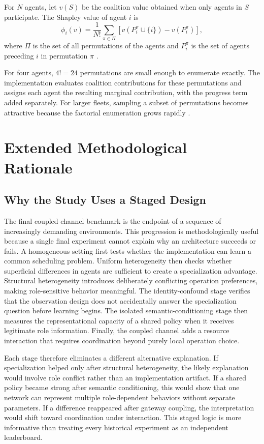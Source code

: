 \documentclass{iutbscthesis}
\begin{document}
\begin{appendices}
For $N$ agents, let $v(S)$ be the coalition value obtained when only agents in $S$ participate. The Shapley value of agent $i$ is
\begin{equation}
\phi_i(v)=\frac{1}{N!}\sum_{\pi\in\Pi}\left[v(P_i^\pi\cup\{i\})-v(P_i^\pi)\right],
\end{equation}
where $\Pi$ is the set of all permutations of the agents and $P_i^\pi$ is the set of agents preceding $i$ in permutation $\pi$ \parencite{shapley1953value}.

For four agents, $4!=24$ permutations are small enough to enumerate exactly. The implementation evaluates coalition contributions for these permutations and assigns each agent the resulting marginal contribution, with the progress term added separately. For larger fleets, sampling a subset of permutations becomes attractive because the factorial enumeration grows rapidly \parencite{castro2009shapley}.


\chapter{Extended Methodological Rationale}
\section{Why the Study Uses a Staged Design}
The final coupled-channel benchmark is the endpoint of a sequence of increasingly demanding environments. This progression is methodologically useful because a single final experiment cannot explain why an architecture succeeds or fails. A homogeneous setting first tests whether the implementation can learn a common scheduling problem. Uniform heterogeneity then checks whether superficial differences in agents are sufficient to create a specialization advantage. Structural heterogeneity introduces deliberately conflicting operation preferences, making role-sensitive behavior meaningful. The identity-confound stage verifies that the observation design does not accidentally answer the specialization question before learning begins. The isolated semantic-conditioning stage then measures the representational capacity of a shared policy when it receives legitimate role information. Finally, the coupled channel adds a resource interaction that requires coordination beyond purely local operation choice.

Each stage therefore eliminates a different alternative explanation. If specialization helped only after structural heterogeneity, the likely explanation would involve role conflict rather than an implementation artifact. If a shared policy became strong after semantic conditioning, this would show that one network can represent multiple role-dependent behaviors without separate parameters. If a difference reappeared after gateway coupling, the interpretation would shift toward coordination under interaction. This staged logic is more informative than treating every historical experiment as an independent leaderboard.


\end{appendices}
\end{document}
